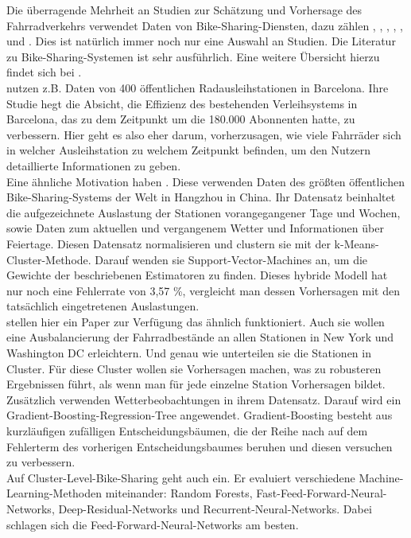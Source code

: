 \documentclass[a4paper,12pt]{thesis}
\begin{document}
Die überragende Mehrheit an Studien zur Schätzung und Vorhersage des Fahrradverkehrs verwendet Daten von Bike-Sharing-Diensten, dazu zählen \cite{Kaltenbrunner2010}, \cite{Xu2013}, \cite{Li2015}, \cite{Mitchell2018PredictingBT}, \cite{Colace2020}, \cite{Gao2022} und \cite{Li2022}. Dies ist natürlich immer noch nur eine Auswahl an Studien. Die Literatur zu Bike-Sharing-Systemen ist sehr ausführlich. Eine weitere Übersicht hierzu findet sich bei \cite{Mitchell2018PredictingBT}.\\
\cite{Kaltenbrunner2010} nutzen z.B. Daten von 400 öffentlichen Radausleihstationen in Barcelona. Ihre Studie hegt die Absicht, die Effizienz des bestehenden Verleihsystems in Barcelona, das zu dem Zeitpunkt um die 180.000 Abonnenten hatte, zu verbessern. Hier geht es also eher darum, vorherzusagen, wie viele Fahrräder sich in welcher Ausleihstation zu welchem Zeitpunkt befinden, um den Nutzern detaillierte Informationen zu geben.\\
Eine ähnliche Motivation haben \cite{Xu2013}. Diese verwenden Daten des größten öffentlichen Bike-Sharing-Systems der Welt in Hangzhou in China. Ihr Datensatz beinhaltet die aufgezeichnete Auslastung der Stationen vorangegangener Tage und Wochen, sowie Daten zum aktuellen und vergangenem Wetter und Informationen über Feiertage. Diesen Datensatz normalisieren und clustern sie mit der k-Means-Cluster-Methode. Darauf wenden sie Support-Vector-Machines an, um die Gewichte der beschriebenen Estimatoren zu finden. Dieses hybride Modell hat nur noch eine Fehlerrate von 3,57 \%, vergleicht man dessen Vorhersagen mit den tatsächlich eingetretenen Auslastungen.\\
\cite{Li2015} stellen hier ein Paper zur Verfügung das ähnlich funktioniert. Auch sie wollen eine Ausbalancierung der Fahrradbestände an allen Stationen in New York und Washington DC erleichtern. Und genau wie \cite{Xu2013} unterteilen sie die Stationen in Cluster. Für diese Cluster wollen sie Vorhersagen machen, was zu robusteren Ergebnissen führt, als wenn man für jede einzelne Station Vorhersagen bildet. Zusätzlich verwenden \cite{Li2015} Wetterbeobachtungen in ihrem Datensatz. Darauf wird ein Gradient-Boosting-Regression-Tree angewendet. Gradient-Boosting besteht aus kurzläufigen zufälligen Entscheidungsbäumen, die der Reihe nach auf dem Fehlerterm des vorherigen Entscheidungsbaumes beruhen und diesen versuchen zu verbessern.\\
Auf Cluster-Level-Bike-Sharing geht auch \cite{Mitchell2018PredictingBT} ein. Er evaluiert verschiedene Machine-Learning-Methoden miteinander: Random Forests, Fast-Feed-Forward-Neural-Networks, Deep-Residual-Networks und Recurrent-Neural-Networks.  Dabei schlagen sich die Feed-Forward-Neural-Networks am besten.\\
\end{document}
